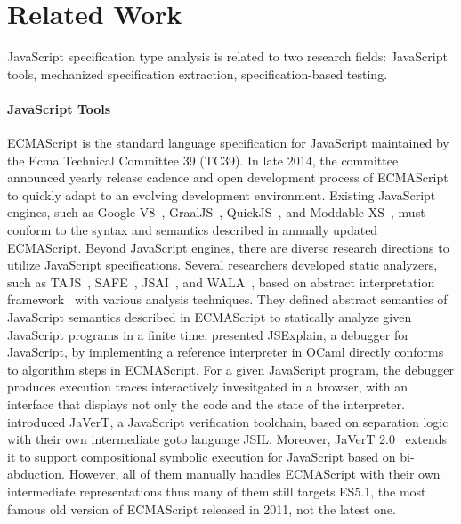 \section{Related Work}\label{sec:related}

JavaScript specification type analysis is related to two research fields:
JavaScript tools, mechanized specification extraction, specification-based
testing.

\paragraph{JavaScript Tools}
ECMAScript is the standard language specification for JavaScript maintained by
the Ecma Technical Committee 39 (TC39).  In late 2014, the committee announced
yearly release cadence and open development process of ECMAScript to quickly
adapt to an evolving development environment.  Existing JavaScript engines, such
as Google V8~\cite{v8}, GraalJS~\cite{graaljs}, QuickJS~\cite{qjs}, and Moddable
XS~\cite{moddable}, must conform to the syntax and semantics described in
annually updated ECMAScript.  Beyond JavaScript engines, there are diverse
research directions to utilize JavaScript specifications.  Several researchers
developed static analyzers, such as TAJS~\cite{tajs}, SAFE~\cite{safe},
JSAI~\cite{jsai}, and WALA~\cite{wala}, based on abstract interpretation
framework~\cite{ai1977, ai1992} with various analysis techniques.  They defined
abstract semantics of JavaScript semantics described in ECMAScript to statically
analyze given JavaScript programs in a finite time.  \citet{jsexplain} presented
JSExplain, a debugger for JavaScript, by implementing a reference interpreter in
OCaml directly conforms to algorithm steps in ECMAScript.  For a given
JavaScript program, the debugger produces execution traces interactively
invesitgated in a browser, with an interface that displays not only the code and
the state of the interpreter.  \citet{javert} introduced JaVerT, a JavaScript
verification toolchain, based on separation logic with their own intermediate
goto language JSIL.  Moreover, JaVerT 2.0~\cite{javert2} extends it to support
compositional symbolic execution for JavaScript based on bi-abduction.  However,
all of them manually handles ECMAScript with their own intermediate
representations thus many of them still targets ES5.1, the most famous old
version of ECMAScript released in 2011, not the latest one.

